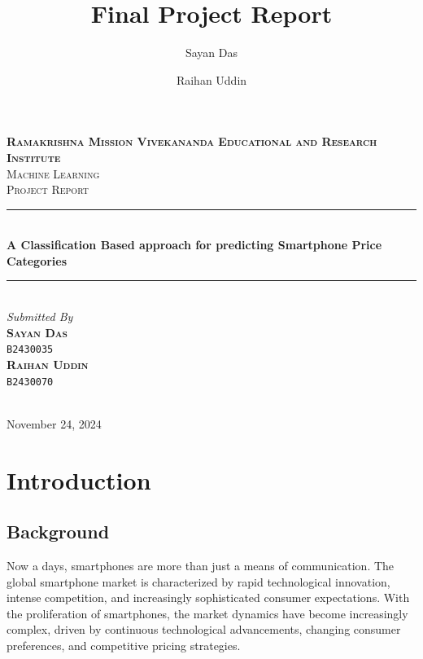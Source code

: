 \documentclass[12pt]{report}
\title{Final Project Report}
\author{
  Sayan Das
  \and
  Raihan Uddin
}
\begin{document}
\begin{titlepage}
	\newcommand{\HRule}{\rule{\linewidth}{0.5mm}}
	\center


	\textsc{\LARGE \textbf{Ramakrishna Mission Vivekananda Educational and Research Institute}}\\[1.5cm]

	\textsc{\LARGE Machine Learning}\\[0.5cm]

	\textsc{\large Project Report}\\[0.5cm]

	\HRule\\[0.4cm]

	{\huge\bfseries A Classification Based approach for predicting Smartphone Price Categories}\\[0.4cm]

	\HRule\\[1.5cm]



\large
\textit{Submitted By}\\
\textsc{\textbf{Sayan Das }}\\
\vspace{-0.5em}
\textsc{\texttt{B2430035 }}\\
\textsc{\textbf{Raihan Uddin }}\\
\vspace{-0.5em}
\textsc{\texttt{B2430070} }\\

	~
	\begin{minipage}{0.4\textwidth}
	\end{minipage}


	\vfill\vfill\vfill

	{\large November 24, 2024}

	\vfill

\end{titlepage}
\restoregeometry

\tableofcontents

\chapter{Introduction}
\section{Background}
Now a days, smartphones are more than just a means of communication. The global smartphone market is characterized by rapid technological innovation, intense competition, and increasingly sophisticated consumer expectations. With the proliferation of smartphones, the market dynamics have become increasingly complex, driven by continuous technological advancements, changing consumer preferences, and competitive pricing strategies.
\end{document}
